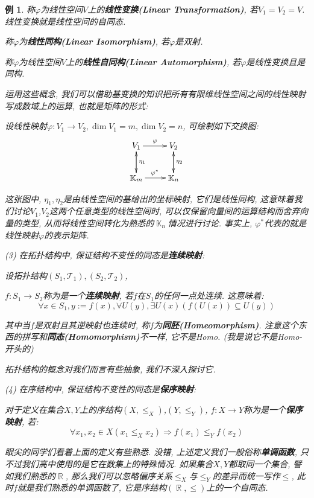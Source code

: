 \documentclass[UTF8]{ctexart}
\newcommand{\<}{\langle}
\renewcommand{\>}{\rangle}
\DeclareMathOperator{\K}{\mathbb{K}}
\DeclareMathOperator{\R}{\mathbb{R}}
\newtheorem{xmp}{例}[subsection]
\begin{document}
\begin{xmp}
                称$\varphi$为线性空间$V$上的\textbf{线性变换(Linear Transformation)}, 若$V_{1}=V_{2}=V$. 线性变换就是线性空间的自同态. 
                
                称$\varphi$为\textbf{线性同构(Linear Isomorphism)}, 若$\varphi$是双射. 
                
                称$\varphi$为线性空间$V$上的\textbf{线性自同构(Linear Automorphism)}, 若$\varphi$是线性变换且是同构. 

                运用这些概念, 我们可以借助基变换的知识把所有有限维线性空间之间的线性映射写成数域上的运算, 也就是矩阵的形式: 
                
                设线性映射$\varphi:V_1\to V_2, \dim V_1=m, \dim V_2=n$, 可绘制如下交换图: 
                \[\begin{matrix}
                \xymatrix{
                V_1\ar[r]^\varphi\ar[d]^{\eta_1} & V_2\ar[d]^{\eta_2}\\
                \K_m\ar[r]^{\varphi^*}\ar[u] & \K_n\ar[u]
                }
                \end{matrix}\]

                这张图中, $\eta_1,\eta_2$是由线性空间的基给出的坐标映射, 它们是线性同构, 这意味着我们讨论$V_1$,$V_2$这两个任意类型的线性空间时, 可以仅保留向量间的运算结构而舍弃向量的类型, 从而将线性空间转化为熟悉的$\K_n$情况进行讨论. 事实上, $\varphi^*$代表的就是线性映射$\varphi$的表示矩阵. 
                \newline

                (3) 在拓扑结构中, 保证结构不变性的同态是\textbf{连续映射}: 

                设拓扑结构$(S_1,\mathcal{T}_1),(S_2,\mathcal{T}_2)$, 

                $f:S_1\to S_2$称为是一个\textbf{连续映射}, 若$f$在$S_1$的任何一点处连续. 这意味着: 
                \[\forall x\in S_1, y:=f(x), \forall U(y), \exists U(x)(f\left(U(x)\right)\subseteq U(y))\]

                其中当$f$是双射且其逆映射也连续时, 称$f$为\textbf{同胚(Homeomorphism)}. 注意这个东西的拼写和\textbf{同态(Homomorphism)}不一样, 它不是Homo. (我是说它不是Homo-开头的)

                拓扑结构的概念对我们而言有些抽象, 我们不深入探讨它. 
                \newline
                
                (4) 在序结构中, 保证结构不变性的同态是\textbf{保序映射}: 

                对于定义在集合$X,Y$上的序结构$(X,\leq_X)$,$(Y,\leq_Y)$, $f:X\to Y$称为是一个\textbf{保序映射}, 若: 
                \[\forall x_1,x_2\in X(x_1\leq_X x_2)\Longrightarrow f(x_1)\leq_Y f(x_2)\]
                
                眼尖的同学们看着上面的定义有些熟悉. 没错, 上述定义我们一般俗称\textbf{单调函数}, 只不过我们高中使用的是它在数集上的特殊情况. 如果集合$X,Y$都取同一个集合, 譬如我们熟悉的$\R$, 那么我们可以忽略偏序关系$\leq_X$与$\leq_Y$的差异而统一写作$\leq$, 此时$f$就是我们熟悉的单调函数了, 它是序结构$(\R,\leq)$上的一个自同态. 
            \end{xmp}
\end{document}
